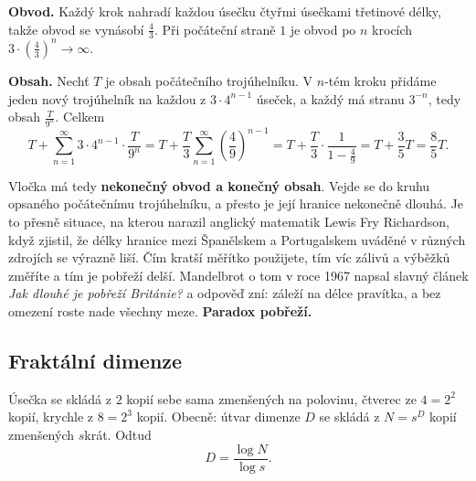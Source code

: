 \begin{center}
\end{center}

\begin{example}
  \textbf{Obvod.} Každý krok nahradí každou úsečku čtyřmi úsečkami třetinové délky, takže obvod se vynásobí $\frac{4}{3}$. Při počáteční straně $1$ je obvod po $n$ krocích $3\cdot\left(\frac{4}{3}\right)^n\to\infty$.

  \textbf{Obsah.} Nechť $T$ je obsah počátečního trojúhelníku. V $n$-tém kroku přidáme jeden nový trojúhelník na každou z $3\cdot 4^{n-1}$ úseček, a každý má stranu $3^{-n}$, tedy obsah $\frac{T}{9^n}$. Celkem
  \begin{equation*}
    T + \sum_{n=1}^{\infty}3\cdot 4^{n-1}\cdot\frac{T}{9^n} = T + \frac{T}{3}\sum_{n=1}^{\infty}\left(\frac{4}{9}\right)^{n-1} = T + \frac{T}{3}\cdot\frac{1}{1 - \frac{4}{9}} = T + \frac{3}{5}T = \frac{8}{5}T.
  \end{equation*}
\end{example}

Vločka má tedy \textbf{nekonečný obvod a konečný obsah}. Vejde se do kruhu opsaného počátečnímu trojúhelníku, a přesto je její hranice nekonečně dlouhá. Je to přesně situace, na kterou narazil anglický matematik Lewis Fry Richardson, když zjistil, že délky hranice mezi Španělskem a Portugalskem uváděné v různých zdrojích se výrazně liší. Čím kratší měřítko použijete, tím víc zálivů a výběžků změříte a tím je pobřeží delší. Mandelbrot o tom v roce 1967 napsal slavný článek \textit{Jak dlouhé je pobřeží Británie?} a odpověď zní: záleží na délce pravítka, a bez omezení roste nade všechny meze. \textbf{Paradox pobřeží.}

\subsection{Fraktální dimenze}

Úsečka se skládá z $2$ kopií sebe sama zmenšených na polovinu, čtverec ze $4 = 2^2$ kopií, krychle z $8 = 2^3$ kopií. Obecně: útvar dimenze $D$ se skládá z $N = s^D$ kopií zmenšených $s$krát. Odtud
\begin{equation*}
  D = \frac{\log N}{\log s}.
\end{equation*}

